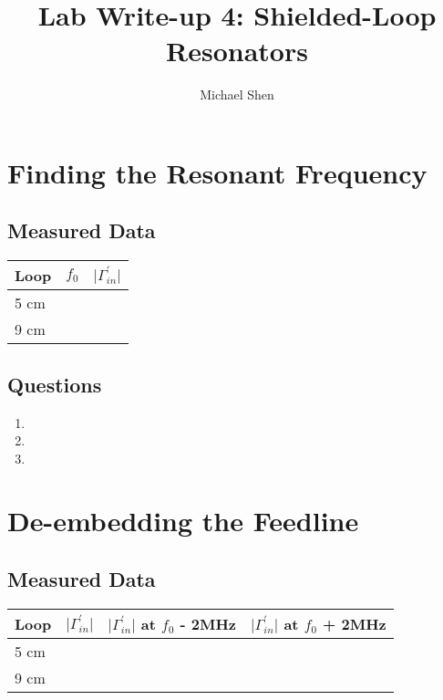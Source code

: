 \documentclass{article}
\begin{document}
\title{Lab Write-up 4: Shielded-Loop Resonators}
\author{Michael Shen}
\maketitle


\section{Finding the Resonant Frequency}

\subsection{Measured Data}

\begin{table}[H]
\centering
\begin{tabular}{|l|l|l|}
\hline
Loop & $f_0$ & $\vert\Gamma^{\prime}_{in}\vert$ \\ \hline
5 cm &  &  \\ \hline
9 cm &  &  \\ \hline
\end{tabular}
\end{table}

\subsection{Questions}

\begin{enumerate}
	\item 
	\item 
	\item 
\end{enumerate}


\section{De-embedding the Feedline}

\subsection{Measured Data}
\begin{table}[H]
\centering
\begin{tabular}{|l|l|l|l|}
\hline
Loop & $\vert\Gamma^{\prime}_{in}\vert$ & $\vert\Gamma^{\prime}_{in}\vert$ at $f_0$ - 2MHz & $\vert\Gamma^{\prime}_{in}\vert$ at $f_0$ + 2MHz \\ \hline
5 cm &  &  &  \\ \hline
9 cm &  &  &  \\ \hline
\end{tabular}
\end{table}
\end{document}
